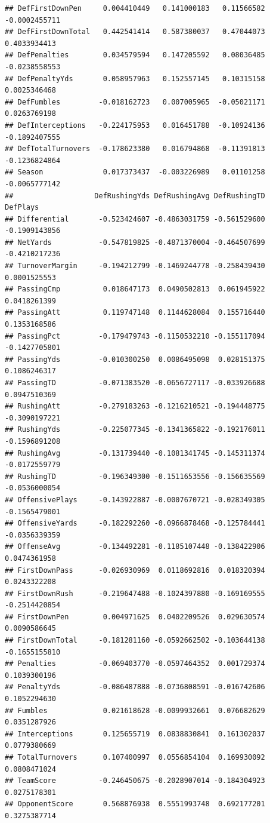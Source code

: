 \documentclass[
]{book}
\begin{document}
\begin{verbatim}
## DefFirstDownPen     0.004410449   0.141000183   0.11566582 -0.0002455711
## DefFirstDownTotal   0.442541414   0.587380037   0.47044073  0.4033934413
## DefPenalties        0.034579594   0.147205592   0.08036485 -0.0238558553
## DefPenaltyYds       0.058957963   0.152557145   0.10315158  0.0025346468
## DefFumbles         -0.018162723   0.007005965  -0.05021171  0.0263769198
## DefInterceptions   -0.224175953   0.016451788  -0.10924136 -0.1892407555
## DefTotalTurnovers  -0.178623380   0.016794868  -0.11391813 -0.1236824864
## Season              0.017373437  -0.003226989   0.01101258 -0.0065777142
##                   DefRushingYds DefRushingAvg DefRushingTD      DefPlays
## Differential       -0.523424607 -0.4863031759 -0.561529600 -0.1909143856
## NetYards           -0.547819825 -0.4871370004 -0.464507699 -0.4210217236
## TurnoverMargin     -0.194212799 -0.1469244778 -0.258439430  0.0001525553
## PassingCmp          0.018647173  0.0490502813  0.061945922  0.0418261399
## PassingAtt          0.119747148  0.1144628084  0.155716440  0.1353168586
## PassingPct         -0.179479743 -0.1150532210 -0.155117094 -0.1427705801
## PassingYds         -0.010300250  0.0086495098  0.028151375  0.1086246317
## PassingTD          -0.071383520 -0.0656727117 -0.033926688  0.0947510369
## RushingAtt         -0.279183263 -0.1216210521 -0.194448775 -0.3090197221
## RushingYds         -0.225077345 -0.1341365822 -0.192176011 -0.1596891208
## RushingAvg         -0.131739440 -0.1081341745 -0.145311374 -0.0172559779
## RushingTD          -0.196349300 -0.1511653556 -0.156635569 -0.0536000054
## OffensivePlays     -0.143922887 -0.0007670721 -0.028349305 -0.1565479001
## OffensiveYards     -0.182292260 -0.0966878468 -0.125784441 -0.0356339359
## OffenseAvg         -0.134492281 -0.1185107448 -0.138422906  0.0474361958
## FirstDownPass      -0.026930969  0.0118692816  0.018320394  0.0243322208
## FirstDownRush      -0.219647488 -0.1024397880 -0.169169555 -0.2514420854
## FirstDownPen        0.004971625  0.0402209526  0.029630574  0.0090586645
## FirstDownTotal     -0.181281160 -0.0592662502 -0.103644138 -0.1655155810
## Penalties          -0.069403770 -0.0597464352  0.001729374  0.1039300196
## PenaltyYds         -0.086487888 -0.0736808591 -0.016742606  0.1052294630
## Fumbles             0.021618628 -0.0099932661  0.076682629  0.0351287926
## Interceptions       0.125655719  0.0838830841  0.161302037  0.0779380669
## TotalTurnovers      0.107400997  0.0556854104  0.169930092  0.0808471024
## TeamScore          -0.246450675 -0.2028907014 -0.184304923  0.0275178301
## OpponentScore       0.568876938  0.5551993748  0.692177201  0.3275387714

\end{verbatim}
\end{document}
